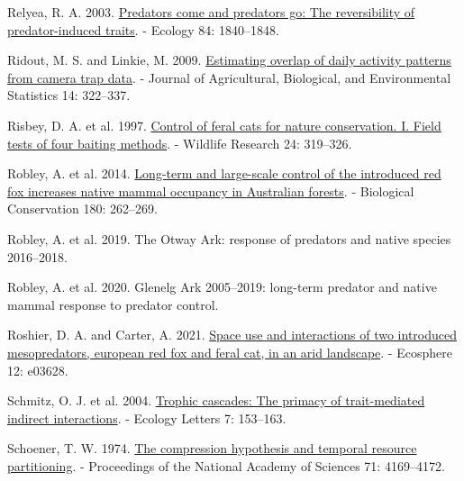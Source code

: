 \documentclass[preprint, 3p, authoryear]{elsarticle} %
\newlength{\cslhangindent}
\newlength{\cslentryspacingunit} %
\newenvironment{CSLReferences}[2] %
 {%
  \setlength{\parindent}{0pt}
  \ifodd #1
  \let\oldpar\par
  \def\par{\hangindent=\cslhangindent\oldpar}
  \fi
  \setlength{\parskip}{#2\cslentryspacingunit}
 }%
 {}
\begin{document}
\begin{CSLReferences}{1}{0}
\leavevmode{}%
Relyea, R. A. 2003. \href{https://doi.org/10.1890/0012-9658(2003)084\%5B1840:PCAPGT\%5D2.0.CO;2}{Predators come and predators go: The reversibility of predator-induced traits}. - Ecology 84: 1840--1848.

\leavevmode{}%
Ridout, M. S. and Linkie, M. 2009. \href{https://doi.org/10.1198/jabes.2009.08038}{Estimating overlap of daily activity patterns from camera trap data}. - Journal of Agricultural, Biological, and Environmental Statistics 14: 322--337.

\leavevmode{}%
Risbey, D. A. et al. 1997. \href{https://doi.org/10.1071/WR96051}{Control of feral cats for nature conservation. I. Field tests of four baiting methods}. - Wildlife Research 24: 319--326.

\leavevmode{}%
Robley, A. et al. 2014. \href{https://doi.org/10.1016/j.biocon.2014.10.017}{Long-term and large-scale control of the introduced red fox increases native mammal occupancy in {{A}ustralian} forests}. - Biological Conservation 180: 262--269.

\leavevmode{}%
Robley, A. et al. 2019. {The Otway Ark: response of predators and native species 2016--2018.}

\leavevmode{}%
Robley, A. et al. 2020. {Glenelg Ark 2005--2019: long-term predator and native mammal response to predator control.}

\leavevmode{}%
Roshier, D. A. and Carter, A. 2021. \href{https://doi.org/10.1002/ecs2.3628}{Space use and interactions of two introduced mesopredators, european red fox and feral cat, in an arid landscape}. - Ecosphere 12: e03628.

\leavevmode{}%
Schmitz, O. J. et al. 2004. \href{https://doi.org/10.1111/j.1461-0248.2003.00560.x}{Trophic cascades: The primacy of trait-mediated indirect interactions}. - Ecology Letters 7: 153--163.

\leavevmode{}%
Schoener, T. W. 1974. \href{https://doi.org/10.1073/pnas.71.10.4169}{The compression hypothesis and temporal resource partitioning}. - Proceedings of the National Academy of Sciences 71: 4169--4172.


\end{CSLReferences}
\end{document}
